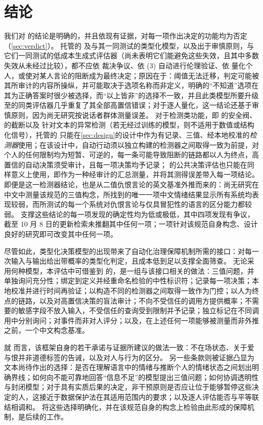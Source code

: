 \section{结论}
\label{sec:conclusion}

我们对 \pol{} 的结论是明确的，并且依现有证据，对每一项作出决定的功能均为否定（\cref{sec:verdict}）。
托管的 \jev{} 及与其一同测试的类型化模型，以及出于审慎原则，与它们一同测试的低成本生成式评估器（尚未表明它们能避免这些失效，且其中多数失效从未经过比较），都不应依  裁决争议、依 (3) 自动进行伦理验证、依  量化个人，或使对某人言论的阻断成为最终决定；原因在于：阈值无法迁移，判定可能被其所审计的内容所操纵，并可能取决于选项名称而非定义，明确的“不知道”选项在其为正确答案时很少被选择，而“以上皆非”的选择不一致，并且此类模型所要升级至的同类评估器几乎重复了其全部高置信错误；对于逐人量化，这一结论还基于审慎原则，因为尚无研究按说话者群体测量误差。
对于检测类功能，即  的安全阀、 的截断以及  针对文本的异常检测（若无经过训练的模型，则不适用于数值或结构化信号），托管的 \jev{} 只能在\cref{sec:design}的设计中作为有记录、三值、经本地校准的\emph{检测器}使用；在该设计中，自动行动须以独立构建的检测器之间取得一致为前提，对个人的任何限制均为短暂、可逆的，每一条可能导致阻断的链路都以人为终点，高置信的自动决策须受审计，且每一项决策均予记录； 的公共决策评估也只能在同样意义上使用，即作为一种经审计的汇总测量，并将其测得误差带入每一项结论。
即便是这一检测器结论，也是从二值仇恨言论的英文基准外推而来的：尚无研究在中文中测量该规范的三值构念，所找到的唯一一项中文情绪结果显示所有系统均表现较弱，而所测试的每一个系统对仇恨言论与仅具冒犯性的语言的区分能力都较弱。
支撑这些结论的每一项发现的确定性均为低或极低，其中四项发现有争议，截至 10 月 8 日的更新检索未推翻其中任何一项；一项针对该规范自身构念、设计良好的研究即可改变其中任何一项。

尽管如此，类型化决策模型的出现带来了自动化治理保障机制所需的接口：对每一次输入与输出给出带概率的类型化判定，且成本低到足以支撑全面筛查。
无论采用何种模型，本评估中可借鉴到 \pol{} 的，是一组与该接口相关的做法：三值问题，并单独询问充分性；绑定到定义并经重命名检验的中性标识符；记录每一项决策；本地校准并进行时间再验证；以构造不同的检测器之间取得一致作为门控；以人为终点的链路，以及对高置信决策的盲法审计；不向不受信任的调用方提供概率；不需要的敏感字段不放入输入，不受信任的查询受到限制并予记录；独立标记在不同调用中分别询问；对事件而非对人评分；以及，在上述任何一项能够被测量而非外推之前，一个中文构念基准。

就 \pol{} 而言，该框架自身的若干承诺与证据所建议的做法一致：不在场状态、关于爱与恨并非道德标签的告诫，以及对人与行为的区分。
另一些条款则被证据凸显为文本尚待作出的选择：是否在理解语言中的情绪与推断个人的情绪状态之间划出明确界线；如何向不能可靠地回答“信息不足”的模型提出三值问题；如何协调透明性与封闭模型；对于具有实质后果的决定，非干预原则是否应让位于能够暂停这些决定的人，这接近于数据保护法在其适用范围内的要求；以及逐人评估能否与平等联结相调和。
将这些选择明确化，并在该规范自身的构念上检验由此形成的保障机制，是后续的工作。
